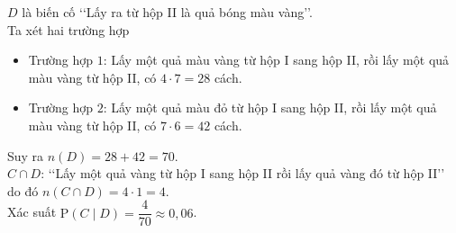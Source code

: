 \begin{ex}
{\begin{itemchoice}
			$D$ là biến cố \lq\lq Lấy ra từ hộp II là quả bóng  màu vàng\rq\rq. \\
			Ta xét hai  trường hợp
			\begin{itemize}
				\item  Trường hợp $1$: Lấy một quả màu vàng từ hộp I sang hộp II, rồi lấy một quả màu vàng từ hộp II, có $4 \cdot 7 =28$ cách.
				\item Trường hợp $2$: Lấy một quả màu đỏ từ hộp I sang hộp II, rồi lấy một quả màu vàng từ hộp II, có $7 \cdot 6 = 42$  cách.
			\end{itemize}
			Suy ra $n(D)=28+42=70$.  \\
			$C \cap D$: \lq\lq Lấy một quả vàng từ hộp I sang hộp II rồi lấy quả vàng đó từ  hộp II\rq\rq\, do đó $n(C\cap D)= 4 \cdot 1 = 4$.\\
			 Xác suất $\mathrm{P}(C\mid D)=\dfrac{4}{70} \approx 0{,}06$.
		\end{itemchoice}
	} 
\end{ex}

